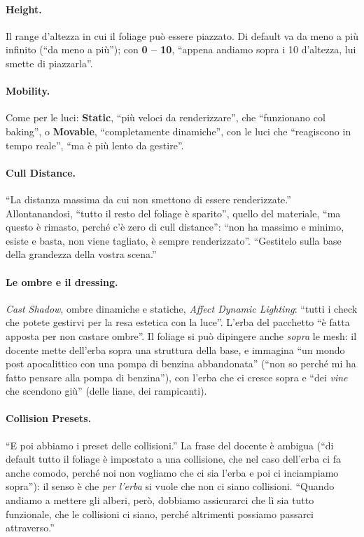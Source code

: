 \paragraph{Height.} Il range d'altezza in cui il foliage può essere piazzato. Di default va
da meno a più infinito (``da meno a più''); con \textbf{0 -- 10}, ``appena andiamo sopra i 10
d'altezza, lui smette di piazzarla''.

\paragraph{Mobility.} Come per le luci: \textbf{Static}, ``più veloci da renderizzare'', che
``funzionano col baking'', o \textbf{Movable}, ``completamente dinamiche'', con le luci che
``reagiscono in tempo reale'', ``ma è più lento da gestire''.

\paragraph{Cull Distance.} ``La distanza massima da cui non smettono di essere renderizzate.''
Allontanandosi, ``tutto il resto del foliage è sparito'', quello del materiale, ``ma questo è
rimasto, perché c'è zero di cull distance'': ``non ha massimo e minimo, esiste e basta, non viene
tagliato, è sempre renderizzato''. ``Gestitelo sulla base della grandezza della vostra scena.''

\paragraph{Le ombre e il dressing.} \emph{Cast Shadow}, ombre dinamiche e statiche,
\emph{Affect Dynamic Lighting}: ``tutti i check che potete gestirvi per la resa estetica con
la luce''. L'erba del pacchetto ``è fatta apposta per non castare ombre''. Il foliage si può
dipingere anche \emph{sopra} le mesh: il docente mette dell'erba sopra una struttura della
base, e immagina ``un mondo post apocalittico con una pompa di benzina abbandonata'' (``non so
perché mi ha fatto pensare alla pompa di benzina''), con l'erba che ci cresce sopra e ``dei
\emph{vine} che scendono giù'' (delle liane, dei rampicanti).

\paragraph{Collision Presets.} ``E poi abbiamo i preset delle collisioni.'' La frase del docente
è ambigua (``di default tutto il foliage è impostato a una collisione, che nel caso dell'erba
ci fa anche comodo, perché noi non vogliamo che ci sia l'erba e poi ci inciampiamo sopra''):
il senso è che \emph{per l'erba} si vuole che non ci siano collisioni. ``Quando andiamo a
mettere gli alberi, però, dobbiamo assicurarci che lì sia tutto funzionale, che le collisioni
ci siano, perché altrimenti possiamo passarci attraverso.''

